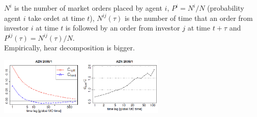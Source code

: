 $N^i$ is the number of market orders placed by agent $i$, $P^i = N^i/N$ (probability agent $i$ take ordet at time $t$), $N^{ij}(\tau)$ is the number of time that an order from investor $i$ at time $t$ is followed by an order from investor $j$ at time $t + \tau$ and $P^{ij}(\tau) = N^{ij}(\tau)/N$.\\
Empirically, hear decomposition is bigger.
\begin{center}
	\includegraphics[width=0.6\textwidth]{picture/(5)autocorr_herd.png}
\end{center}
